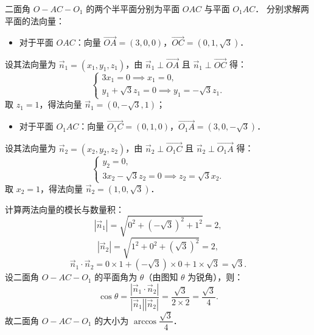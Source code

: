 \begin{answer}
二面角 $O - AC - O_1$ 的两个半平面分别为平面 $OAC$ 与平面 $O_1AC$．
分别求解两平面的法向量：
\begin{itemize}
\item 对于平面 $OAC$：向量 $\vec{OA} = (3, 0, 0)$，$\vec{OC} = (0, 1, \sqrt{3})$．
\end{itemize}
  设其法向量为 $\vec{n}_1 = (x_1, y_1, z_1)$，由 $\vec{n}_1 \perp \vec{OA}$ 且 $\vec{n}_1 \perp \vec{OC}$ 得：
\nopagebreak[4]
\[
\begin{cases}
3x_1 = 0 \implies x_1 = 0, \\
y_1 + \sqrt{3}z_1 = 0 \implies y_1 = -\sqrt{3}z_1.
\end{cases}
\]
  取 $z_1 = 1$，得法向量 $\vec{n}_1 = (0, -\sqrt{3}, 1)$；
\begin{itemize}
\item 对于平面 $O_1AC$：向量 $\vec{O_1C} = (0, 1, 0)$，$\vec{O_1A} = (3, 0, -\sqrt{3})$．
\end{itemize}
  设其法向量为 $\vec{n}_2 = (x_2, y_2, z_2)$，由 $\vec{n}_2 \perp \vec{O_1C}$ 且 $\vec{n}_2 \perp \vec{O_1A}$ 得：
\nopagebreak[4]
\[
\begin{cases}
y_2 = 0, \\
3x_2 - \sqrt{3}z_2 = 0 \implies z_2 = \sqrt{3}x_2.
\end{cases}
\]
  取 $x_2 = 1$，得法向量 $\vec{n}_2 = (1, 0, \sqrt{3})$．

计算两法向量的模长与数量积：
\nopagebreak[4]
\[
|\vec{n}_1| = \sqrt{0^2 + (-\sqrt{3})^2 + 1^2} = 2,
\]
\nopagebreak[4]
\[
|\vec{n}_2| = \sqrt{1^2 + 0^2 + (\sqrt{3})^2} = 2,
\]
\nopagebreak[4]
\[
\vec{n}_1 \cdot \vec{n}_2 = 0 \times 1 + (-\sqrt{3}) \times 0 + 1 \times \sqrt{3} = \sqrt{3}.
\]
设二面角 $O - AC - O_1$ 的平面角为 $\theta$（由图知 $\theta$ 为锐角），则：
\nopagebreak[4]
\[
\cos\theta = \frac{|\vec{n}_1 \cdot \vec{n}_2|}{|\vec{n}_1||\vec{n}_2|} = \frac{\sqrt{3}}{2 \times 2} = \frac{\sqrt{3}}{4}.
\]
故二面角 $O - AC - O_1$ 的大小为 $\arccos\dfrac{\sqrt{3}}{4}$．



\end{answer}
